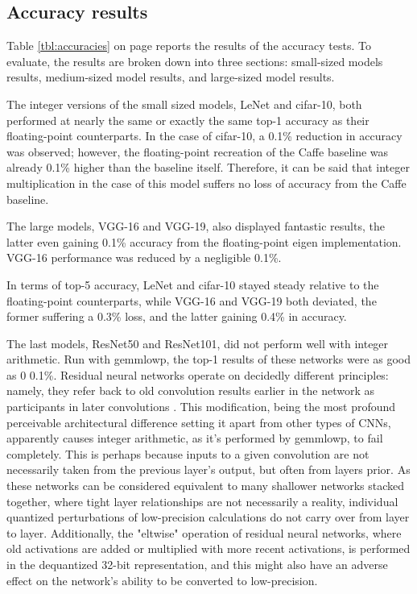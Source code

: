\subsection{Accuracy results}
Table \ref{tbl:accuracies} on page \pageref{tbl:accuracies} reports the results of the accuracy tests. To evaluate, the results are broken down into three sections: small-sized models results, medium-sized model results, and large-sized model results.

The integer versions of the small sized models, LeNet and cifar-10, both performed at nearly the same or exactly the same top-1 accuracy as their floating-point counterparts. In the case of cifar-10, a 0.1\% reduction in accuracy was observed; however, the floating-point recreation of the Caffe baseline was already 0.1\% higher than the baseline itself. Therefore, it can be said that integer multiplication in the case of this model suffers no loss of accuracy from the Caffe baseline.

The large models, VGG-16 and VGG-19, also displayed fantastic results, the latter even gaining 0.1\% accuracy from the floating-point eigen implementation. VGG-16 performance was reduced by a negligible 0.1\%.

In terms of top-5 accuracy, LeNet and cifar-10 stayed steady relative to the floating-point counterparts, while VGG-16 and VGG-19 both deviated, the former suffering a 0.3\% loss, and the latter gaining 0.4\% in accuracy.

The last models, ResNet50 and ResNet101, did not perform well with integer arithmetic. Run with gemmlowp, the top-1 results of these networks were as good as 0\/ 0.1\%. Residual neural networks operate on decidedly different principles: namely, they refer back to old convolution results earlier in the network as participants in later convolutions \cite{resnets2}. This modification, being the most profound perceivable architectural difference setting it apart from other types of CNNs, apparently causes integer arithmetic, as it's performed by gemmlowp, to fail completely. This is perhaps because inputs to a given convolution are not necessarily taken from the previous layer's output, but often from layers prior. As these networks can be considered equivalent to many shallower networks stacked together, where tight layer relationships are not necessarily a reality, individual quantized perturbations of low-precision calculations do not carry over from layer to layer. Additionally, the "eltwise" operation of residual neural networks, where old activations are added or multiplied with more recent activations, is performed in the dequantized 32-bit representation, and this might also have an adverse effect on the network's ability to be converted to low-precision.

